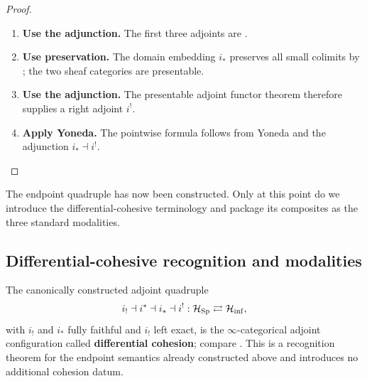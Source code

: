 \begin{proof}
\leavevmode
\begin{enumerate}[label=\textup{(\arabic*)}]
    \item \textbf{Use the adjunction.}
    The first three adjoints are .

    \item \textbf{Use preservation.}
    The domain embedding \(i_*\) preserves all small colimits by
    ; the two sheaf categories are presentable.

    \item \textbf{Use the adjunction.}
    The presentable adjoint functor theorem therefore supplies a right adjoint \(i^!\).

    \item \textbf{Apply Yoneda.}
    The pointwise formula follows from Yoneda and the adjunction \(i_*\dashv i^!\).
\end{enumerate}
\end{proof}
The endpoint quadruple has now been constructed. Only at this point do we
introduce the differential-cohesive terminology and package its composites as
the three standard modalities.

\subsection{Differential-cohesive recognition and modalities}

\begin{theorem}
\label{thm:differential-cohesive-recognition}
The canonically constructed adjoint quadruple
\[
    i_!\dashv i^*\dashv i_*\dashv i^!
    :
    \mathcal H_{\operatorname{Sp}}
    \rightleftarrows
    \mathcal H_{\inf},
\]
with \(i_!\) and \(i_*\) fully faithful and \(i_!\) left exact, is the
\(\infty\)-categorical adjoint configuration called \textbf{differential
cohesion}; compare \cite{KhavkineSchreiber2017}. This is a
recognition theorem for the endpoint semantics already constructed above and
introduces no additional cohesion datum.
\end{theorem}

